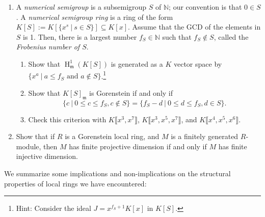 \documentclass[11pt]{book}
\numberwithin{equation}{section}
\numberwithin{theorem}{chapter}
\theoremstyle{definition}
\newtheorem*{basic properties}{Basic Properties}
\newtheorem*{Important Remark}{Important Remark}
\theoremstyle{remark}
\newcommand{\NN}{\mathbb{N}}
\newcommand{\m}{\mathfrak{m}}
\newcommand{\Hom}{\operatorname{Hom}}
\newcommand{\Ext}{\operatorname{Ext}}
\newcommand{\Tor}{\operatorname{Tor}}
\renewcommand{\H}{\operatorname{H}}
\begin{document}
\begin{enumerate}
\begin{enumerate}
	
		\item Suppose moreover that $S$ is regular. Let $P_\bullet\to R$ be the minimal free resolution of $R$ as an $S$-module. Show that,  $P_{\bullet}\cong \Hom_S(P_\bullet,S)$.\footnote{To match up the indexing, $P_{\bullet}\cong [\Hom_S(P_\bullet,S)]^{d-\bullet}$}\footnote{You can use without proof the fact that any two minimal resolutions are isomorphic.}
		
	
		
		\item With the same assumptions as in the previous part, show that $\Tor^S_i(R,M)\cong \Ext^i_S(R,M)$ for all $S$-modules $M$.
		
	
		
	\end{enumerate}
	
	\item A \emph{numerical semigroup} is a subsemigroup $S$ of $\NN$; our convention is that $0\in S$. A \emph{numerical semigroup ring} is a ring of the form $K[S]:=K[\{x^s \ | \ s\in S\}]\subseteq K[x]$. Assume that the GCD of the elements in $S$ is 1. Then, there is a largest number $f_S \in \NN$ such that $f_S \notin S$, called the \emph{Frobenius number of $S$}.
	
	
	
	\begin{enumerate}
		\item Show that $\H^1_{\m}(K[S])$ is generated as a $K$ vector space by $\{x^a \ | \ a\leq f_S \text{ and } a\notin S \}$.\footnote{Hint: Consider the ideal $J=x^{f_S +1}K[x]$ in $K[S]$.} 
		
		
		\item Show that $K[S]_\m$ is Gorenstein if and only if \[\{ c \ | \ 0 \leq c\leq f_S, c \notin S \} = \{ f_S -d \ | \ 0\leq d \leq f_S, d\in S \}.\]
		
		\item Check this criterion with $K\llbracket x^3, x^7\rrbracket$, $K\llbracket x^3, x^5, x^7 \rrbracket$, and $K\llbracket x^4, x^5, x^6 \rrbracket$.
	\end{enumerate}
	

	
	\item Show that if $R$ is a Gorenstein local ring, and $M$ is a finitely generated $R$-module, then $M$ has finite projective dimension if and only if $M$ has finite injective dimension.
\end{enumerate}


We summarize some implications and non-implications on the structural properties of local rings we have encountered:
\end{document}
